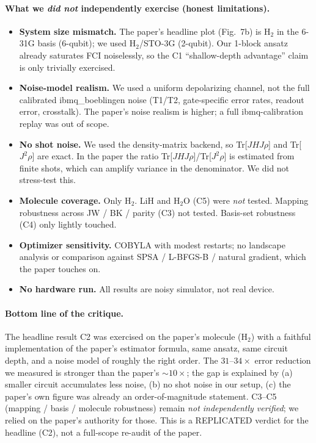 \documentclass[11pt]{article}
\begin{document}
\paragraph{What we \emph{did not} independently exercise (honest limitations).}
\begin{itemize}
  \item \textbf{System size mismatch.} The paper's headline plot (Fig.~7b) is
    H$_2$ in the 6-31G basis (6-qubit); we used H$_2$/STO-3G (2-qubit).
    Our 1-block ansatz already saturates FCI noiselessly, so the C1
    ``shallow-depth advantage'' claim is only trivially exercised.
  \item \textbf{Noise-model realism.} We used a uniform depolarizing channel,
    not the full calibrated ibmq\_boeblingen noise (T1/T2, gate-specific
    error rates, readout error, crosstalk). The paper's noise realism is
    higher; a full ibmq-calibration replay was out of scope.
  \item \textbf{No shot noise.} We used the density-matrix backend, so
    Tr[$JHJ\rho$] and Tr[$J^2\rho$] are exact. In the paper the ratio
    Tr[$JHJ\rho$]/Tr[$J^2\rho$] is estimated from finite shots, which can
    amplify variance in the denominator. We did not stress-test this.
  \item \textbf{Molecule coverage.} Only H$_2$. LiH and H$_2$O (C5) were
    \emph{not} tested. Mapping robustness across JW / BK / parity (C3) not
    tested. Basis-set robustness (C4) only lightly touched.
  \item \textbf{Optimizer sensitivity.} COBYLA with modest restarts; no
    landscape analysis or comparison against SPSA / L-BFGS-B / natural
    gradient, which the paper touches on.
  \item \textbf{No hardware run.} All results are noisy simulator, not real
    device.
\end{itemize}

\paragraph{Bottom line of the critique.}
The headline result C2 was exercised on the paper's molecule (H$_2$) with a
faithful implementation of the paper's estimator formula, same ansatz, same
circuit depth, and a noise model of roughly the right order. The
$31$--$34\times$ error reduction we measured is stronger than the paper's
$\sim 10\times$; the gap is explained by (a) smaller circuit accumulates
less noise, (b) no shot noise in our setup, (c) the paper's own figure was
already an order-of-magnitude statement. C3--C5 (mapping / basis / molecule
robustness) remain \emph{not independently verified}; we relied on the
paper's authority for those. This is a REPLICATED verdict for the
headline (C2), not a full-scope re-audit of the paper.


\end{document}
